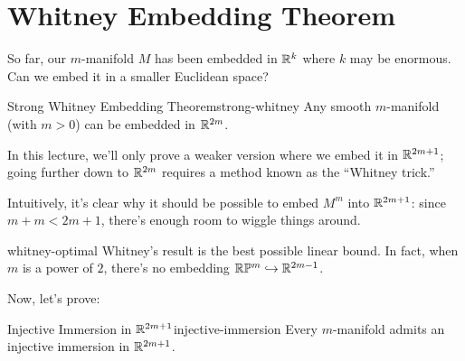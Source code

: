 
\section{Whitney Embedding Theorem}

So far, our $m$-manifold $M$ has been embedded in $\mathbb{R}^k$ where $k$ may be enormous. Can we embed it in a smaller Euclidean space?

\begin{theorem}{Strong Whitney Embedding Theorem}{strong-whitney}
    Any smooth $m$-manifold (with $m > 0$) can be embedded in $\mathbb{R}^{2m}$.
\end{theorem}

In this lecture, we'll only prove a weaker version where we embed it in $\mathbb{R}^{2m+1}$; going further down to $\mathbb{R}^{2m}$ requires a method known as the ``Whitney trick.''

Intuitively, it's clear why it should be possible to embed $M^m$ into $\mathbb{R}^{2m+1}$: since $m + m < 2m + 1$, there's enough room to wiggle things around.

\begin{center}
\end{center}

\begin{remark}{}{whitney-optimal}
    Whitney's result is the best possible linear bound. In fact, when $m$ is a power of $2$, there's no embedding $\mathbb{R}\mathbb{P}^m \hookrightarrow \mathbb{R}^{2m-1}$.
\end{remark}

Now, let's prove:

\begin{theorem}{Injective Immersion in $\mathbb{R}^{2m+1}$}{injective-immersion}
    Every $m$-manifold admits an injective immersion in $\mathbb{R}^{2m+1}$.
\end{theorem}

